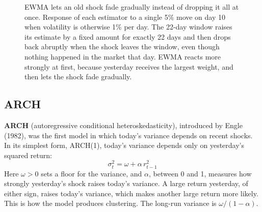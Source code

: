\begin{figure}[htbp]
\centering
{}
\caption{EWMA lets an old shock fade gradually instead of dropping it all at once. Response of each estimator to a single 5\% move on day 10 when volatility is otherwise 1\% per day. The 22-day window raises its estimate by a fixed amount for exactly 22 days and then drops back abruptly when the shock leaves the window, even though nothing happened in the market that day. EWMA reacts more strongly at first, because yesterday receives the largest weight, and then lets the shock fade gradually.}
\label{fig:10-ewma-shock}
\end{figure}

\subsection{ARCH}
\label{sec:10-arch}

\textbf{ARCH} (autoregressive conditional heteroskedasticity), introduced by Engle (1982), was the first model in which today's variance depends on recent shocks. In its simplest form, ARCH(1), today's variance depends only on yesterday's squared return:
\begin{equation}
  \sigma^2_t = \omega + \alpha\,r^2_{t-1}
  \label{eq:10-arch}
\end{equation}
Here $\omega > 0$ sets a floor for the variance, and $\alpha$, between 0 and 1, measures how strongly yesterday's shock raises today's variance. A large return yesterday, of either sign, raises today's variance, which makes another large return more likely. This is how the model produces clustering. The long-run variance is $\omega / (1 - \alpha)$.

